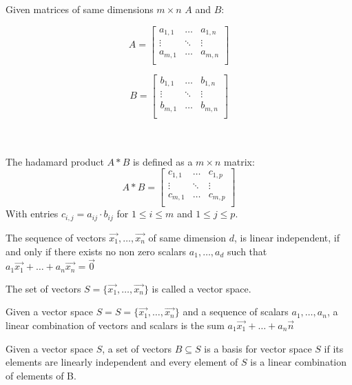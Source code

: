 \begin{mydef}
	Given matrices of same dimensions $m \times n$ $A$ and $B$: \\
	\begin{minipage}{0.4\linewidth}
		\begin{equation*}
			A = 
			\begin{bmatrix}
				a_{1 ,1} & \ldots & a_{1, n} \\
				\vdots & \ddots & \vdots \\
				a_{m ,1} & \ldots & a_{m, n} \\
			\end{bmatrix}
		\end{equation*}
	\end{minipage}	
	\begin{minipage}[b]{0.59\linewidth}
		\begin{equation*}
			B = 
			\begin{bmatrix}
				b_{1 ,1} & \ldots & b_{1, n} \\
				\vdots & \ddots & \vdots \\
				b_{m ,1} & \ldots & b_{m, n} \\
			\end{bmatrix}
		\end{equation*}
	\end{minipage}	
\\ \\
	The hadamard product $A*B$ is defined as a  $m \times n$ matrix:
	\begin{equation*}
	 A*B = 
	\begin{bmatrix}
		c_{1 ,1} & \ldots & c_{1, p} \\
		\vdots & \ddots & \vdots \\
		c_{m ,1} & \ldots & c_{m, p} \\
	\end{bmatrix}
	\end{equation*}
	With entries $c_{i,j} = a_{ij} \cdot b_{ij}$ for $1 \leq i \leq m$ and $1 \leq j \leq p$.
\end{mydef}
\begin{mydef}
	The sequence of vectors $\vec{x_1}, \ldots, \vec{x_n}$ of same dimension $d$, is linear independent, if and only if there exists no non zero scalars $a_1, \ldots, a_d$ such that $a_1\vec{x_1} + \ldots + a_n\vec{x_n} = \vec{0}$
\end{mydef}
\begin{mydef}
	The set of vectors $S = \{\vec{x_1}, \ldots, \vec{x_n}\}$ is called a vector space.
\end{mydef}
\begin{mydef}
	Given a vector space $S = S = \{\vec{x_1}, \ldots, \vec{x_n}\}$ and a sequence of scalars $a_1, \ldots, a_n$, a linear combination of vectors and scalars is the sum $a_1\vec{x_1} + \ldots + a_n\vec{n}$
\end{mydef}
\begin{mydef}
	Given a vector space $S$, a set of vectors $B \subseteq S$ is a basis for vector space $S$ if its elements are linearly independent and every element of $S$ is a linear combination of elements of B.
\end{mydef}


